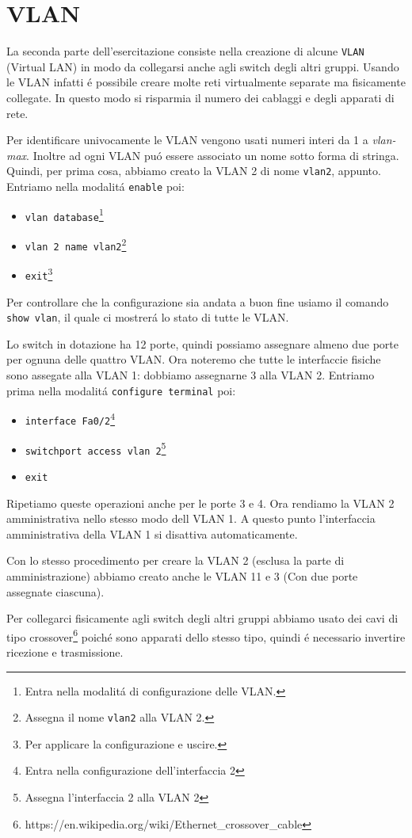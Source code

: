 \documentclass[9pt, a4paper, oneside]{article}
\begin{document}
		\section{VLAN}
			\par
				La seconda parte dell'esercitazione consiste 
				nella creazione di alcune \texttt{VLAN} 
				(Virtual LAN) in modo da collegarsi anche 
				agli switch degli altri gruppi. Usando le VLAN 
				infatti \'e possibile creare molte reti 
				virtualmente separate ma fisicamente collegate. 
				In questo modo si risparmia il numero dei 
				cablaggi e degli apparati di rete.
			\par
				Per identificare univocamente le VLAN vengono 
				usati numeri interi da 1 a \emph{vlan-max}. 
				Inoltre ad ogni VLAN pu\'o essere associato un 
				nome sotto forma di stringa. Quindi, per prima 
				cosa, abbiamo creato la VLAN 2 di nome 
				\texttt{vlan2}, appunto. Entriamo nella 
				modalit\'a \texttt{enable} poi:
				\begin{itemize}
					\item
						\texttt{vlan 
						database}\footnote{Entra nella 
						modalit\'a di configurazione 
						delle VLAN.}
					\item
						\texttt{vlan 2 name 
						vlan2}\footnote{Assegna il nome 
						\texttt{vlan2} alla VLAN 2.}
					\item
						\texttt{exit}\footnote{Per 
						applicare la configurazione e 
						uscire.}
				\end{itemize}
				Per controllare che la configurazione sia 
				andata a buon fine usiamo il comando 
				\texttt{show vlan}, il quale ci mostrer\'a lo 
				stato di tutte le VLAN.
			\par
				Lo switch in dotazione ha 12 porte, quindi 
				possiamo assegnare almeno due porte per ognuna 
				delle quattro VLAN. Ora noteremo che tutte le 
				interfaccie fisiche sono assegate alla VLAN 1: 
				dobbiamo assegnarne 3 alla VLAN 2. Entriamo 
				prima nella modalit\'a \texttt{configure 
				terminal} poi:
				\begin{itemize}
					\item
						\texttt{interface 
						Fa0/2}\footnote{Entra nella 
						configurazione 
						dell'interfaccia 2}
					\item
						\texttt{switchport access 
						vlan 2}\footnote{Assegna 
						l'interfaccia 2 alla VLAN 2}
					\item
						\texttt{exit}
				\end{itemize}
				Ripetiamo queste operazioni anche per le porte 
				3 e 4.
				Ora rendiamo la VLAN 2 amministrativa nello 
				stesso modo dell VLAN 1. A questo punto 
				l'interfaccia amministrativa della VLAN 1 si 
				disattiva automaticamente.
			\par
				Con lo stesso procedimento per creare la VLAN 
				2 (esclusa la parte di amministrazione) abbiamo 
				creato anche le VLAN 11 e 3 (Con due porte 
				assegnate ciascuna).
			\par
				Per collegarci fisicamente agli switch degli 
				altri gruppi abbiamo usato dei cavi di tipo 
				crossover\footnote{https://en.wikipedia.org/wiki/Ethernet\_crossover\_cable} 
				poich\'e sono apparati dello stesso tipo, 
				quindi \'e necessario invertire ricezione e 
				trasmissione.
\end{document}
